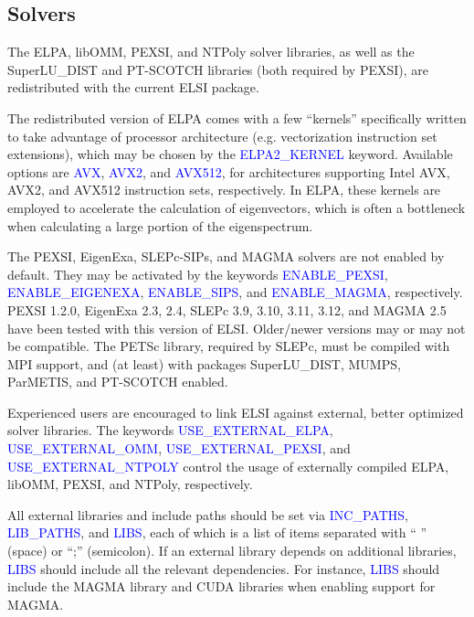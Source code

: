\documentclass{report}
\begin{document}
\subsection{Solvers}
\label{subsec:config_solvers}
The ELPA, libOMM, PEXSI, and NTPoly solver libraries, as well as the SuperLU\_DIST and PT-SCOTCH libraries (both required by PEXSI), are redistributed with the current ELSI package.

The redistributed version of ELPA comes with a few ``kernels'' specifically written to take advantage of processor architecture (e.g. vectorization instruction set extensions), which may be chosen by the \textcolor{blue}{ELPA2\_KERNEL} keyword. Available options are \textcolor{blue}{AVX}, \textcolor{blue}{AVX2}, and \textcolor{blue}{AVX512}, for architectures supporting Intel AVX, AVX2, and AVX512 instruction sets, respectively. In ELPA, these kernels are employed to accelerate the calculation of eigenvectors, which is often a bottleneck when calculating a large portion of the eigenspectrum.

The PEXSI, EigenExa, SLEPc-SIPs, and MAGMA solvers are not enabled by default. They may be activated by the keywords \textcolor{blue}{ENABLE\_PEXSI}, \textcolor{blue}{ENABLE\_EIGENEXA}, \textcolor{blue}{ENABLE\_SIPS}, and \textcolor{blue}{ENABLE\_MAGMA}, respectively. PEXSI 1.2.0, EigenExa 2.3, 2.4, SLEPc 3.9, 3.10, 3.11, 3.12, and MAGMA 2.5 have been tested with this version of ELSI. Older/newer versions may or may not be compatible. The PETSc library, required by SLEPc, must be compiled with MPI support, and (at least) with packages SuperLU\_DIST, MUMPS, ParMETIS, and PT-SCOTCH enabled.

Experienced users are encouraged to link ELSI against external, better optimized solver libraries. The keywords \textcolor{blue}{USE\_EXTERNAL\_ELPA}, \textcolor{blue}{USE\_EXTERNAL\_OMM}, \textcolor{blue}{USE\_EXTERNAL\_PEXSI}, and \textcolor{blue}{USE\_EXTERNAL\_NTPOLY} control the usage of externally compiled ELPA, libOMM, PEXSI, and NTPoly, respectively.

All external libraries and include paths should be set via \textcolor{blue}{INC\_PATHS}, \textcolor{blue}{LIB\_PATHS}, and \textcolor{blue}{LIBS}, each of which is a list of items separated with `` '' (space) or ``;'' (semicolon). If an external library depends on additional libraries, \textcolor{blue}{LIBS} should include all the relevant dependencies. For instance, \textcolor{blue}{LIBS} should include the MAGMA library and CUDA libraries when enabling support for MAGMA.
\end{document}
